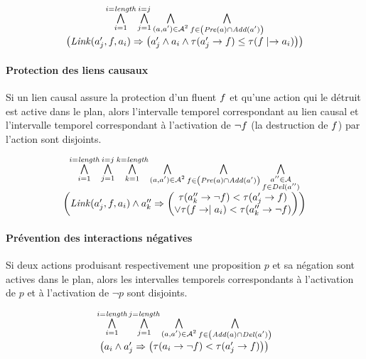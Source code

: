 \[
\begin{matrix}
\bigwedge\limits_{\substack{i=1}}^{i=\textit{length}} \bigwedge\limits_{\substack{j=1}}^{i=j} \bigwedge\limits_{\substack{(a,a')\in\mathcal{A}^{2}}} \bigwedge\limits_{\substack{f\in\left(\mathit{Pre}(a)\cap\mathit{Add}(a')\right)}}\\ \left( \mathit{Link}(a'_{j},f,a_{i}) \Rightarrow \left( a'_{j} \wedge a_{i} \wedge \tau(a'_{j}\rightarrow f) \leq \tau(f\mid\rightarrow a_{i}) \right) \right)
\end{matrix}
\]

\paragraph{Protection des liens causaux}

Si un lien causal assure la protection d’un fluent $f$ et qu'une action qui le détruit est active dans le plan, alors l’intervalle temporel correspondant au lien causal et l’intervalle temporel correspondant à l’activation de $\neg f$ (la destruction de $f$) par l’action sont disjoints.

\[
\begin{matrix}
\bigwedge\limits_{\substack{i=1}}^{i=\textit{length}} \bigwedge\limits_{\substack{j=1}}^{i=j} \bigwedge\limits_{\substack{k=1}}^{k=\textit{length}} \bigwedge\limits_{\substack{(a,a')\in\mathcal{A}^{2}}} \bigwedge\limits_{\substack{f\in\left(\mathit{Pre}(a)\cap\mathit{Add}(a')\right)}} \bigwedge\limits_{\substack{a''\in\mathcal{A}\\f\in\mathit{Del}(a'')}}\\ \left( \mathit{Link}(a'_{j},f,a_{i}) \wedge a''_{k} \Rightarrow \left( \begin{matrix} \tau(a''_{k}\rightarrow\neg f) < \tau(a'_{j}\rightarrow f)\\ \vee \tau(f\rightarrow\mid a_{i}) < \tau(a''_{k}\rightarrow\neg f) \end{matrix} \right) \right)
\end{matrix}
\]

\paragraph{Prévention des interactions négatives}

Si deux actions produisant respectivement une proposition $p$ et sa négation sont actives dans le plan, alors les intervalles temporels correspondants à l’activation de $p$ et à l’activation de $\neg p$ sont disjoints.

\[
\begin{matrix}
\BigforallTwo{i=1}{i=\length} \BigforallTwo{j=1}{j=\length} \Bigforall{(\a,\b)\in\A^{2}} \Bigforall{\f\in\left(\Add{\a}\cap\Del{\b}\right)}\\ \left( \a_{i} \wedge \b_{j} \Rightarrow \left( \begin{matrix} \tau(\a_{i}\rightarrow\neg\f) < \tau(\b_{j}\rightarrow\f)%
\end{matrix} \right) \right)
\end{matrix}
\]

